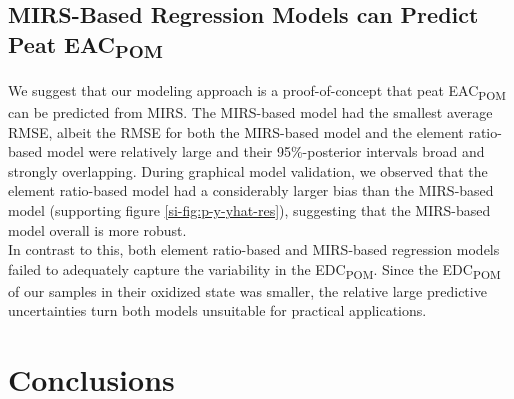 \documentclass[draft,linenumbers]{agujournal2018}
\begin{document}
\subsection{\texorpdfstring{MIRS-Based Regression Models can Predict
Peat
EAC\textsubscript{POM}}{MIRS-Based Regression Models can Predict Peat EAC}}

We suggest that our modeling approach is a proof-of-concept that peat
EAC\textsubscript{POM} can be predicted from MIRS. The MIRS-based model
had the smallest average RMSE, albeit the RMSE for both the MIRS-based
model and the element ratio-based model were relatively large and their
95\%-posterior intervals broad and strongly overlapping. During
graphical model validation, we observed that the element ratio-based
model had a considerably larger bias than the MIRS-based model
(supporting figure \ref{si-fig:p-y-yhat-res}), suggesting that the
MIRS-based model overall is more robust.\\
In contrast to this, both element ratio-based and MIRS-based regression
models failed to adequately capture the variability in the
EDC\textsubscript{POM}. Since the EDC\textsubscript{POM} of our samples
in their oxidized state was smaller, the relative large predictive
uncertainties turn both models unsuitable for practical applications.

\section{Conclusions}
\end{document}
